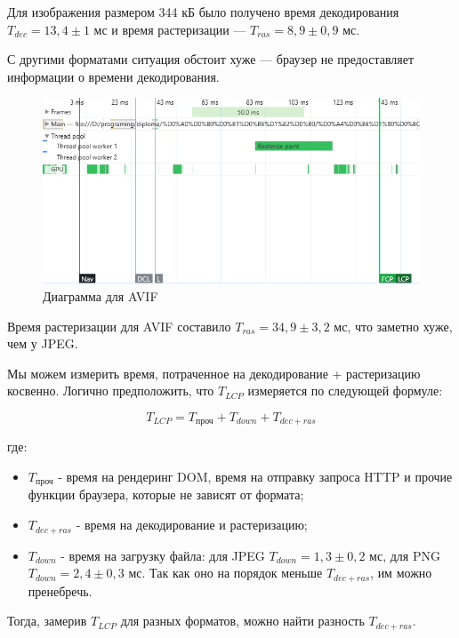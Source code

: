 \documentclass[12pt]{article}
\begin{document}
Для изображения размером 344 кБ было получено время декодирования
$T_{dec} = 13,4 \pm 1$ мс и время растеризации — $T_{ras} = 8,9 \pm 0,9$ мс.

С другими форматами ситуация обстоит хуже — браузер не предоставляет информации
о времени декодирования.

\begin{figure}[H]
    \centering
    \includegraphics[width=1\textwidth]{../images/image_comp/avif_one_image.png}
    \caption{Диаграмма для AVIF}
\end{figure}

Время растеризации для AVIF составило $T_{ras} = 34,9 \pm 3,2$ мс,
что заметно хуже, чем у JPEG.

Мы можем измерить время, потраченное на декодирование + растеризацию косвенно.
Логично предположить, что $T_{LCP}$ измеряется по следующей формуле:

\[
    T_{LCP} = T_{\text{проч}} + T_{down} + T_{dec+ras}
\]

где:

\begin{itemize}
    \item $T_{\text{проч}}$ - время на рендеринг DOM, время на отправку
          запроса HTTP и прочие
          функции браузера, которые не зависят от формата;
    \item $T_{dec+ras}$ - время на декодирование и растеризацию;
    \item $T_{down}$ - время на загрузку файла: для JPEG $T_{down} = 1{,}3 \pm 0{,}2 \text{ мс}$,
          для PNG $T_{down} = 2{,}4 \pm 0{,}3 \text{ мс}$. Так как оно на порядок меньше $T_{dec+ras}$,
          им можно пренебречь.
\end{itemize}

Тогда, замерив $T_{LCP}$ для разных форматов, можно найти разность $T_{dec+ras}$.
\end{document}
